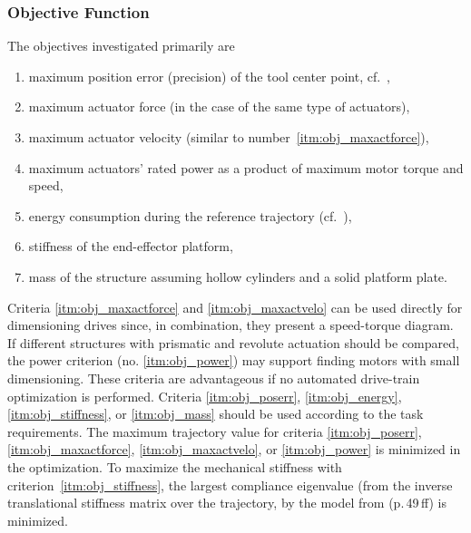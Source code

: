 %
%
%



\subsubsection{Objective Function}
\label{sec:ds_objective}



The objectives investigated primarily are
\begin{enumerate}
  \item \label{itm:obj_poserr} maximum position error (precision) of the tool center point, cf.~\cite{Merlet2006a},
  \item \label{itm:obj_maxactforce} maximum actuator force (in the case of the same type of actuators),
  \item \label{itm:obj_maxactvelo} maximum actuator velocity (similar to number~\ref*{itm:obj_maxactforce}),
  \item \label{itm:obj_power} maximum actuators' rated power as a product of maximum motor torque and speed,
  \item \label{itm:obj_energy} energy consumption during the reference trajectory (cf.~\cite{SchapplerOrt2020}),
  \item \label{itm:obj_stiffness} stiffness of the end-effector platform,
  \item \label{itm:obj_mass} mass of the structure assuming hollow cylinders and a solid platform plate. %
\end{enumerate}

Criteria %
%
\ref*{itm:obj_maxactforce} and \ref*{itm:obj_maxactvelo} can be used directly for dimensioning drives since, in combination, they present a speed-torque diagram.
If different structures with prismatic and revolute actuation should be compared, the power criterion (no. \ref*{itm:obj_power}) may support finding motors with small dimensioning.
These criteria are advantageous if no automated drive-train optimization is performed. %
Criteria \ref*{itm:obj_poserr}, \ref*{itm:obj_energy}, \ref*{itm:obj_stiffness}, or \ref*{itm:obj_mass} should be used according to the task requirements.
The {maximum} trajectory value for criteria \ref*{itm:obj_poserr}, \ref*{itm:obj_maxactforce}, \ref*{itm:obj_maxactvelo}, or \ref*{itm:obj_power} is minimized in the optimization.
To maximize the mechanical stiffness with criterion~\ref*{itm:obj_stiffness}, the largest compliance eigenvalue (from the inverse translational stiffness matrix over the trajectory, by the model from \cite{Krefft2006} (p.\,49\,ff) is minimized.

